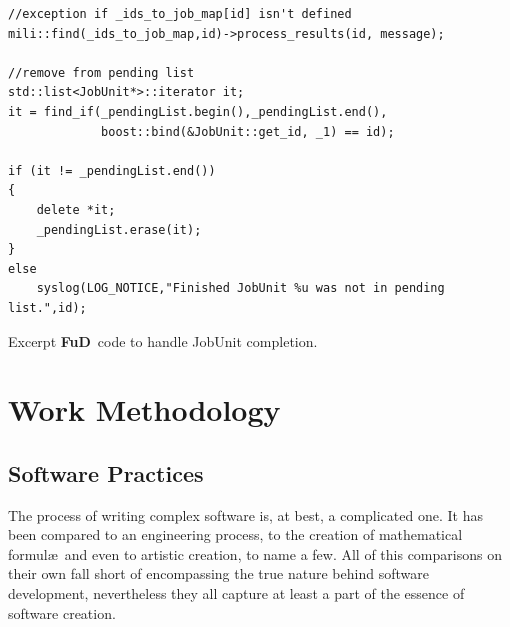 \documentclass[a4paper,12pt,english]{report}
\newcommand{\fud}{\textbf{FuD}}
\begin{document}
\begin{table}[!htb]
\lstset{language=C++}
\begin{lstlisting}[frame=single]
//exception if _ids_to_job_map[id] isn't defined
mili::find(_ids_to_job_map,id)->process_results(id, message);

//remove from pending list
std::list<JobUnit*>::iterator it;
it = find_if(_pendingList.begin(),_pendingList.end(), 
             boost::bind(&JobUnit::get_id, _1) == id);

if (it != _pendingList.end())
{
    delete *it;
    _pendingList.erase(it);
}
else
    syslog(LOG_NOTICE,"Finished JobUnit %u was not in pending list.",id);
\end{lstlisting}
\centering \caption{Excerpt \fud \ code to handle JobUnit completion.} 
\label{cppfind}
\end{table}

\chapter{Work Methodology}

\section{Software Practices}

The process of writing complex software is, at best, a complicated one. It has been compared to an engineering process, to the creation of mathematical formul\ae \ and even to artistic creation, to name a few. All of this comparisons on their own fall short of encompassing the true nature behind software development, nevertheless they all capture at least a part of the essence of software creation.
\end{document}
